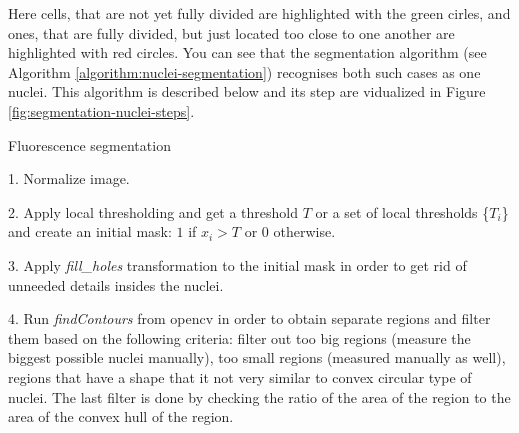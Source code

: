 Here cells, that are not yet fully divided are highlighted with the green cirles, and ones, that are fully divided, but just located too close to one another are highlighted with red circles. You can see that the segmentation algorithm (see Algorithm \ref{algorithm:nuclei-segmentation}) recognises both such cases as one nuclei. This algorithm is described below and its step are vidualized in Figure \ref{fig:segmentation-nuclei-steps}.
\begin{algorithm}
    \caption{Fluorescence segmentation}
    \begin{algorithmic}
    \item 1. Normalize image.
    \item 2. Apply local thresholding and get a threshold $T$ or a set of local thresholds \{$T_i$\} and create an initial mask: $1$ if $x_i > T$ or $0$ otherwise.  
    \item 3. Apply \textit{fill\_holes} transformation to the initial mask in order to get rid of unneeded details insides the nuclei.
    \item 4. Run \textit{findContours} from opencv in order to obtain separate regions and filter them based on the following criteria: filter out too big regions (measure the biggest possible nuclei manually), too small regions (measured manually as well), regions that have a shape that it not very similar to convex circular type of nuclei. The last filter is done by checking the ratio of the area of the region to the area of the convex hull of the region. 
    \end{algorithmic}
    \label{algorithm:nuclei-segmentation}
\end{algorithm}    

